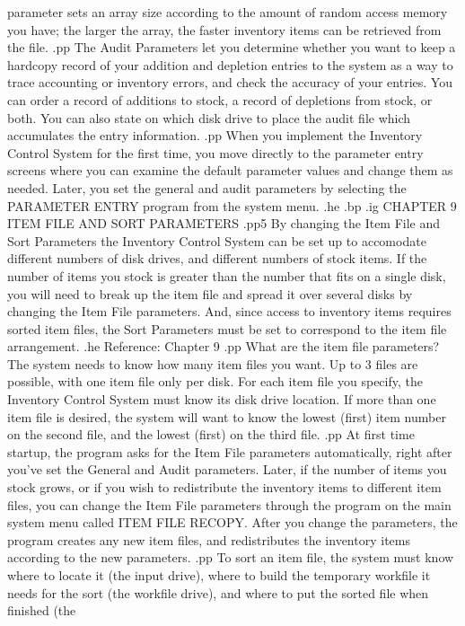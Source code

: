 parameter sets an array size according to the amount of random access
memory you have; the larger the array, the faster inventory items can
be retrieved from the file.
.pp
The Audit Parameters let you determine whether you want to keep a hardcopy
record of your addition and depletion entries to the system as a way to
trace accounting or inventory errors, and check the accuracy of your
entries.  You can order a record of additions to stock, a record of
depletions from stock, or both.  You can also state on which disk
drive to place the audit file which accumulates the entry information.
.pp
When you implement the Inventory Control System for the first time, you
move directly to the parameter entry screens where you can examine
the default parameter values and
change them as needed.	Later, you set the general and audit
parameters by selecting
the PARAMETER ENTRY program from the system menu.
.he
.bp
.ig
CHAPTER 9
ITEM FILE AND SORT PARAMETERS
.pp5
By changing the Item File and Sort Parameters the Inventory Control
System can be set up to accomodate different numbers
of disk drives, and different numbers of stock items.  If the number
of items you stock is greater than the number that fits on a single
disk, you will need to break up the item file and spread it over
several disks by changing the Item File parameters.  And, since access
to inventory items requires sorted item files, the Sort Parameters must
be set to correspond to the item file arrangement.
.he Reference: Chapter 9
.pp
What are the item file parameters?  The system needs to know how many
item files you want.  Up to 3 files are possible, with one item
file only per disk.  For each item file you specify, the Inventory
Control System must know its disk drive location.  If more
than one item file is desired, the system will want to know the lowest
(first) item number on the second file, and the lowest (first)
on the third file.
.pp
At first time startup, the program asks for the Item File parameters
automatically, right after you've set the General and Audit parameters.
Later, if the number of items you stock grows, or if you wish to
redistribute the inventory items to different item files, you can
change the Item File parameters through the program on the main system
menu called ITEM FILE RECOPY.  After you change the parameters, the
program creates any new item files, and redistributes the inventory
items according to the new parameters.
.pp
To sort an item file, the system must know where to locate it (the input
drive), where to build the temporary workfile it needs for the sort (the
workfile drive), and where to put the sorted file when finished (the
